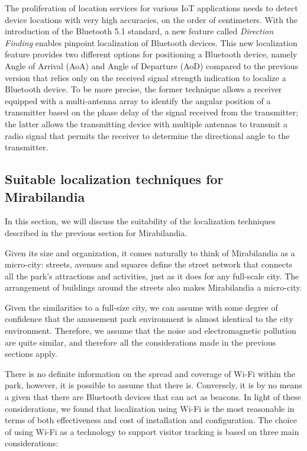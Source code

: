 The proliferation of location services for various IoT applications needs to detect device locations with very high accuracies, on the order of
centimeters. With the introduction of the Bluetooth 5.1 standard, a new feature called \textit{Direction Finding} enables pinpoint localization
of Bluetooth devices.
This new localization feature provides two different options for positioning a Bluetooth device, namely Angle of Arrival (AoA) and Angle of Departure
(AoD) compared to the previous version that relies only on the received signal strength indication to localize a Bluetooth device.
To be more precise, the former technique allows a receiver equipped with a multi-antenna array to identify the angular position of a transmitter
based on the phase delay of the signal received from the transmitter; the latter allows the transmitting device with multiple antennas to transmit a
radio signal that permits the receiver to determine the directional angle to the transmitter.

\subsection{Suitable localization techniques for Mirabilandia}
In this section, we will discuss the suitability of the localization techniques described in the previous section for Mirabilandia.

Given its size and organization, it comes naturally to think of Mirabilandia as a micro-city: streets, avenues and squares define the street network
that connects all the park's attractions and activities, just as it does for any full-scale city. The arrangement of buildings around
the streets also makes Mirabilandia a micro-city.

Given the similarities to a full-size city, we can assume with some degree of confidence that the amusement park environment is almost identical to
the city environment.
Therefore, we assume that the noise and electromagnetic pollution are quite similar, and therefore all the considerations made in the previous
sections apply.

There is no definite information on the spread and coverage of Wi-Fi within the park, however, it is possible to assume that there is.
Conversely, it is by no means a given that there are Bluetooth devices that can act as beacons.
In light of these considerations, we found that localization using Wi-Fi is the most reasonable in terms of both effectiveness and cost of
installation and configuration. The choice of using Wi-Fi as a technology to support visitor tracking is based on three main considerations:

